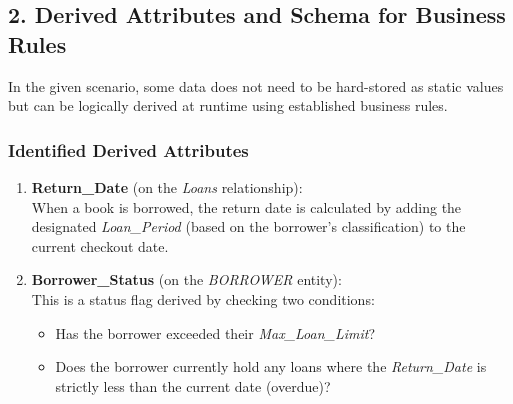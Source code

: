 \documentclass[12pt,a3paper]{article}
\begin{document}
\begin{enumerate}
\begin{tcolorbox}[enhanced,breakable,ansbox,colback=cA!4,colframe=cA,boxrule=0.8pt,arc=5pt,title={\textbf{Answer}},fonttitle=\bfseries\color{white},colbacktitle=cA]
\begin{center}
{
}
\end{center}

\vspace{1em}
\subsection*{2. Derived Attributes and Schema for Business Rules}

In the given scenario, some data does not need to be hard-stored as static values but can be logically derived at runtime using established business rules. 

\subsubsection*{Identified Derived Attributes}
\begin{enumerate}
    \item \textbf{Return\_Date} (on the \textit{Loans} relationship):\\
    When a book is borrowed, the return date is calculated by adding the designated \textit{Loan\_Period} (based on the borrower's classification) to the current checkout date. 
    \item \textbf{Borrower\_Status} (on the \textit{BORROWER} entity):\\
    This is a status flag derived by checking two conditions:
    \begin{itemize}
        \item Has the borrower exceeded their \textit{Max\_Loan\_Limit}?
        \item Does the borrower currently hold any loans where the \textit{Return\_Date} is strictly less than the current date (overdue)?
    \end{itemize}
\end{enumerate}


\end{tcolorbox}
\end{enumerate}
\end{document}

